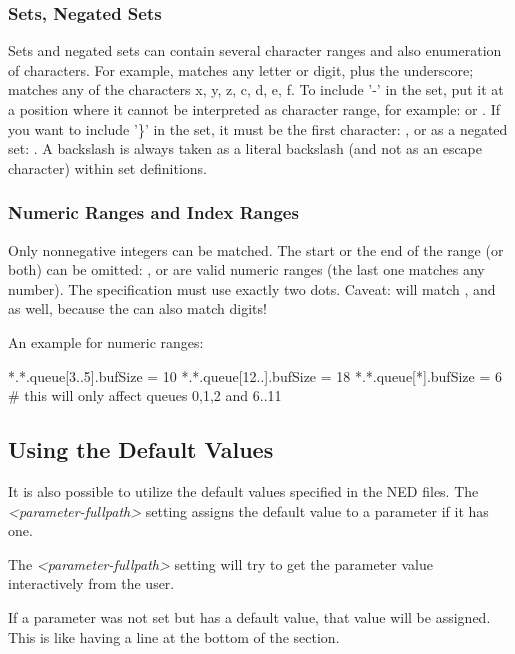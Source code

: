\subsubsection{Sets, Negated Sets}

Sets and negated sets can contain several character ranges and also
enumeration of characters. For example,  matches any letter
or digit, plus the underscore;  matches any of the characters
x, y, z, c, d, e, f.
To include '-' in the set, put it at a position where it cannot be
interpreted as character range, for example:  or .
If you want to include '\}' in the set, it must be the first
character: , or as a negated set: .
A backslash is always taken as a literal backslash (and not as an escape character)
within set definitions.


\subsubsection{Numeric Ranges and Index Ranges}

Only nonnegative integers can be matched.  The start or the end of the range
(or both) can be omitted: ,  or 
are valid numeric ranges (the last one matches any number).
The specification must use exactly two dots.
Caveat:  will match ,  and  as well,
because the \ttt{*} can also match digits!

An example for numeric ranges:

\begin{inifile}
[General]
*.*.queue[3..5].bufSize = 10
*.*.queue[12..].bufSize = 18
*.*.queue[*].bufSize = 6  # this will only affect queues 0,1,2 and 6..11
\end{inifile}


\subsection{Using the Default Values}

It is also possible to utilize the default values specified in the NED files.
The \textit{<parameter-fullpath>} setting assigns
the default value to a parameter if it has one.

The \textit{<parameter-fullpath>} setting will try to get the parameter
value interactively from the user.

If a parameter was not set but has a default value, that value will be
assigned. This is like having a  line at the
bottom of the \ttt{[General]} section.

